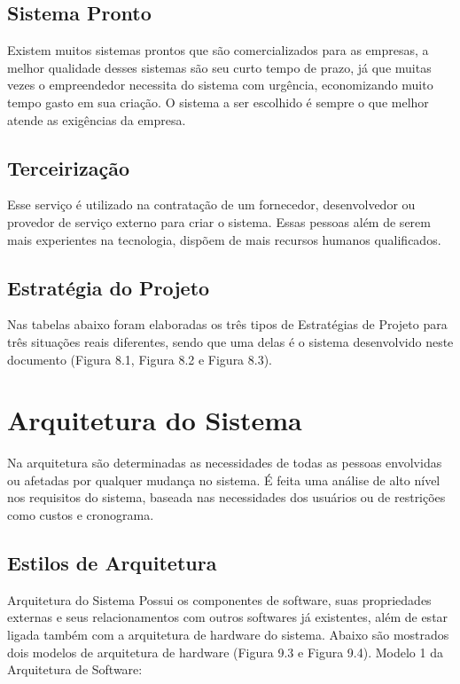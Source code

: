 \subsection{Sistema Pronto}
Existem muitos sistemas prontos que são comercializados para as empresas, a melhor qualidade desses sistemas são seu curto tempo de prazo, já que muitas vezes o empreendedor necessita do sistema com urgência, economizando muito tempo gasto em sua criação. O sistema a ser escolhido é sempre o que melhor atende as exigências da empresa.

\subsection{Terceirização}
 Esse serviço é utilizado na contratação de um fornecedor, desenvolvedor ou provedor de serviço externo para criar o sistema. Essas pessoas além de serem mais experientes na tecnologia, dispõem de mais recursos humanos qualificados.

\subsection{Estratégia do Projeto}
 Nas tabelas abaixo foram elaboradas os três tipos de Estratégias de Projeto para três situações reais diferentes, sendo que uma delas é o sistema desenvolvido neste documento (Figura 8.1, Figura 8.2 e Figura 8.3).
 
\section{Arquitetura do Sistema}
Na arquitetura são determinadas as necessidades de todas as pessoas envolvidas ou afetadas por qualquer mudança no sistema. É feita uma análise de alto nível nos requisitos do sistema, baseada nas necessidades dos usuários ou de restrições como custos e cronograma.

\subsection{Estilos de Arquitetura}
Arquitetura do Sistema
Possui os componentes de software, suas propriedades externas e seus relacionamentos com outros softwares já existentes, além de estar ligada também com a arquitetura de hardware do sistema. Abaixo são mostrados dois modelos de arquitetura de hardware (Figura 9.3 e Figura 9.4).
Modelo 1 da Arquitetura de Software: